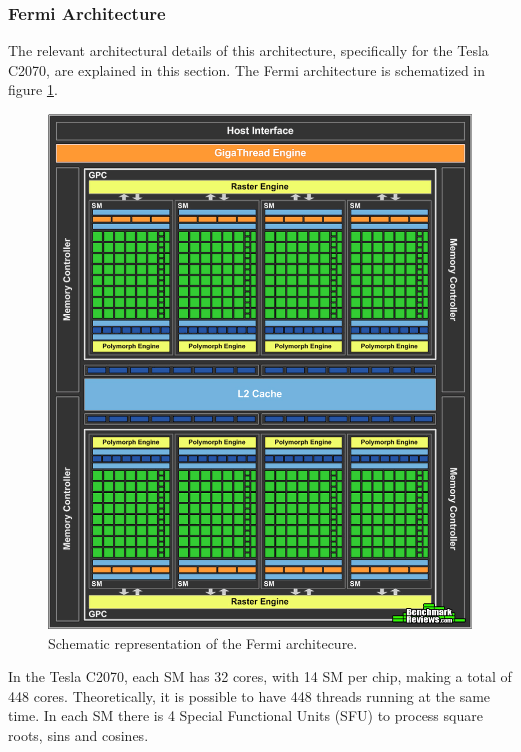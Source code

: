 \subsubsection{\nvidia Fermi Architecture}

The relevant architectural details of this architecture, specifically for the Tesla C2070, are explained in this section. The Fermi architecture is schematized in figure \ref{fig:fermi}.

\begin{figure}[!htp]
	\begin{center}
		\includegraphics[scale=0.25]{../../common/img/fermi_arch.png}
		\caption{Schematic representation of the \nvidia Fermi architecure.}
		\label{fig:fermi}
	\end{center}
\end{figure}

In the Tesla C2070, each SM has 32 \cuda cores, with 14 SM per chip, making a total of 448 \cuda cores. Theoretically, it is possible to have 448 \cuda threads running at the same time. In each SM there is 4 Special Functional Units (SFU) to process square roots, sins and cosines.

